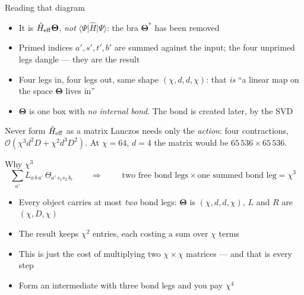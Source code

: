 \documentclass[aspectratio=169,10pt]{beamer}
\newcommand{\element}[3]{\langle #1\vert #2\vert #3\rangle}
\newcommand{\bigO}{\mathcal{O}}
\newcommand{\hH}{\hat{H}}
\begin{document}
\begin{frame}{Reading that diagram}
  \begin{itemize}
    \item It is $\hH_{\rm eff}\bm\Theta$, \emph{not} $\element\Psi\hH\Psi$: the bra $\bm\Theta^*$ has been removed
    \item \alert{Primed} indices $a',s',t',b'$ are summed against the input; the four \alert{unprimed} legs dangle --- they are the result
    \item Four legs in, four legs out, same shape $(\chi,d,d,\chi)$: that \emph{is} ``a linear map on the space $\bm\Theta$ lives in''
    \item $\bm\Theta$ is \alert{one} box with \emph{no internal bond}. The bond is created later, by the SVD
  \end{itemize}
  \vspace{0.4em}
  \begin{block}{Never form $\hH_{\rm eff}$ as a matrix}
    Lanczos needs only the \emph{action}: four contractions, $\bigO(\chi^3d^2D+\chi^2d^3D^2)$.
    At $\chi=64$, $d=4$ the matrix would be $65\,536\times65\,536$.
  \end{block}
\end{frame}

\begin{frame}{Why $\chi^3$}
  \[
    \sum_{a'}L_{a\,b\,a'}\,\Theta_{a'\,s_1s_2\,b_r}
    \qquad\Longrightarrow\qquad
    \boxed{\;\text{two free bond legs}\times\text{one summed bond leg}=\chi^3\;}
  \]
  \begin{itemize}
    \item Every object carries at most \emph{two} bond legs: $\bm\Theta$ is $(\chi,d,d,\chi)$, $L$ and $R$ are $(\chi,D,\chi)$
    \item The result keeps $\chi^2$ entries, each costing a sum over $\chi$ terms
    \item This is just the cost of multiplying two $\chi\times\chi$ matrices --- and that is every step
    \item Form an intermediate with \alert{three} bond legs and you pay $\chi^4$
  \end{itemize}
\end{frame}
\end{document}
